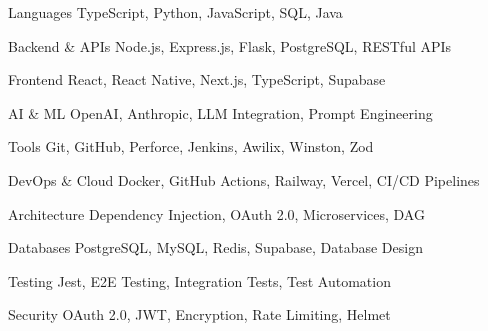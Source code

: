 \documentclass[12pt, letterpaper]{russell}
\begin{document}

\vspace{-0.45cm}

\begin{minipage}[t]{0.48\textwidth}
\begin{cvskills}
  \cvskill
    {Languages} %
    {TypeScript, Python, JavaScript, SQL, Java} %

  \cvskill
    {Backend \& APIs} %
    {Node.js, Express.js, Flask, PostgreSQL, RESTful APIs} %

  \cvskill
    {Frontend} %
    {React, React Native, Next.js, TypeScript, Supabase} %

  \cvskill
    {AI \& ML} %
    {OpenAI, Anthropic, LLM Integration, Prompt Engineering} %

    \cvskill
    {Tools} %
    {Git, GitHub, Perforce, Jenkins, Awilix, Winston, Zod} %
\end{cvskills}
\end{minipage}
\hfill
\begin{minipage}[t]{0.48\textwidth}
\begin{cvskills}
  \cvskill
    {DevOps \& Cloud} %
    {Docker, GitHub Actions, Railway, Vercel, CI/CD Pipelines} %

  \cvskill
    {Architecture} %
    {Dependency Injection, OAuth 2.0, Microservices, DAG} %

  \cvskill
    {Databases} %
    {PostgreSQL, MySQL, Redis, Supabase, Database Design} %

  \cvskill
    {Testing} %
    {Jest, E2E Testing, Integration Tests, Test Automation} %

    \cvskill
    {Security} %
    {OAuth 2.0, JWT, Encryption, Rate Limiting, Helmet} %
    
\end{cvskills}
\end{minipage}
\vspace{0.1cm}
\end{document}

